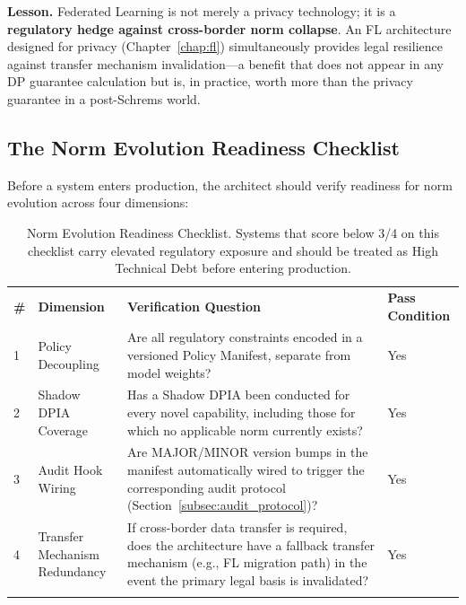 \textbf{Lesson.} Federated Learning is not merely a privacy technology; it is a \textbf{regulatory hedge against cross-border norm collapse}. An FL architecture designed for privacy (Chapter~\ref{chap:fl}) simultaneously provides legal resilience against transfer mechanism invalidation---a benefit that does not appear in any DP guarantee calculation but is, in practice, worth more than the privacy guarantee in a post-Schrems world.

\subsection{The Norm Evolution Readiness Checklist}
\label{subsec:norm_readiness_checklist}

Before a system enters production, the architect should verify readiness for norm evolution across four dimensions:

\begin{table}[ht]
\centering
\caption{Norm Evolution Readiness Checklist. Systems that score below 3/4 on this checklist carry elevated regulatory exposure and should be treated as High Technical Debt before entering production.}
\label{tab:norm_readiness}
\renewcommand{\arraystretch}{1.3}
\begin{tabular}{p{0.5cm} p{3.8cm} p{5.5cm} p{2.0cm}}
\hline\noalign{\smallskip}
\textbf{\#} & \textbf{Dimension} & \textbf{Verification Question} & \textbf{Pass Condition} \\
\noalign{\smallskip}\svhline\noalign{\smallskip}
1 & Policy Decoupling & Are all regulatory constraints encoded in a versioned Policy Manifest, separate from model weights? & Yes \\[4pt]
2 & Shadow DPIA Coverage & Has a Shadow DPIA been conducted for every novel capability, including those for which no applicable norm currently exists? & Yes \\[4pt]
3 & Audit Hook Wiring & Are MAJOR/MINOR version bumps in the manifest automatically wired to trigger the corresponding audit protocol (Section~\ref{subsec:audit_protocol})? & Yes \\[4pt]
4 & Transfer Mechanism Redundancy & If cross-border data transfer is required, does the architecture have a fallback transfer mechanism (e.g., FL migration path) in the event the primary legal basis is invalidated? & Yes \\
\noalign{\smallskip}\hline\noalign{\smallskip}
\end{tabular}
\end{table}

